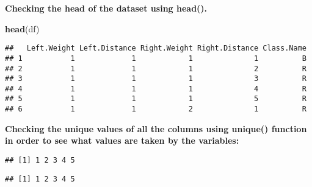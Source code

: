 \documentclass[
]{article}
\newenvironment{Shaded}{\begin{snugshade}}{\end{snugshade}}
\newcommand{\KeywordTok}[1]{\textcolor[rgb]{0.13,0.29,0.53}{\textbf{#1}}}
\newcommand{\NormalTok}[1]{#1}
\newcommand{\OperatorTok}[1]{\textcolor[rgb]{0.81,0.36,0.00}{\textbf{#1}}}
\newcommand{\StringTok}[1]{\textcolor[rgb]{0.31,0.60,0.02}{#1}}
\begin{document}
\textbf{Checking the head of the dataset using head().}

\begin{Shaded}
\begin{Highlighting}[]
\KeywordTok{head}\NormalTok{(df)}
\end{Highlighting}
\end{Shaded}

\begin{verbatim}
##   Left.Weight Left.Distance Right.Weight Right.Distance Class.Name
## 1           1             1            1              1          B
## 2           1             1            1              2          R
## 3           1             1            1              3          R
## 4           1             1            1              4          R
## 5           1             1            1              5          R
## 6           1             1            2              1          R
\end{verbatim}

\textbf{Checking the unique values of all the columns using unique()
function in order to see what values are taken by the variables:}

\begin{Shaded}
\end{Shaded}

\begin{verbatim}
## [1] 1 2 3 4 5
\end{verbatim}

\begin{Shaded}
\end{Shaded}

\begin{verbatim}
## [1] 1 2 3 4 5
\end{verbatim}

\begin{Shaded}
\end{Shaded}
\end{document}
